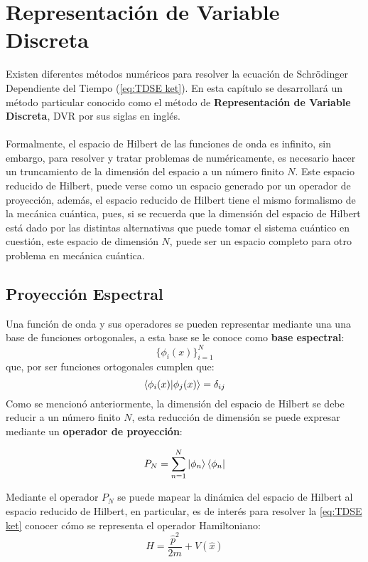 \chapter{Representación de Variable Discreta}\label{ch:DVR}
Existen diferentes métodos numéricos para resolver la ecuación de Schrödinger Dependiente del Tiempo (\autoref{eq:TDSE ket}). En esta capítulo se desarrollará un método particular conocido como el método de \textbf{Representación de Variable Discreta}, \acs{DVR} por sus siglas en inglés.
\\\\
Formalmente, el espacio de Hilbert de las funciones de onda es infinito, sin embargo, para resolver y tratar problemas de numéricamente, es necesario hacer un truncamiento de la dimensión del espacio a un número finito $N$. Este espacio reducido de Hilbert, puede verse como un espacio generado por un operador de proyección, además, el espacio reducido de Hilbert tiene el mismo formalismo de la mecánica cuántica, pues, si se recuerda que la dimensión del espacio de Hilbert está dado por las distintas alternativas que puede tomar el sistema cuántico en cuestión, este espacio de dimensión $N$, puede ser un espacio completo para otro problema en mecánica cuántica.

\section{Proyección Espectral}
Una función de onda y sus operadores se pueden representar mediante una una base de funciones ortogonales, a esta base se le conoce como \textbf{base espectral}:
$$\{\phi_i(x)\}_{i=1}^{N}$$
que, por ser funciones ortogonales cumplen que:
$$\bra{\phi_i(x)}\ket{\phi_j(x)} = \delta_{ij}$$
Como se mencionó anteriormente, la dimensión del espacio de Hilbert se debe reducir a un número finito $N$, esta reducción de dimensión se puede expresar mediante un \textbf{operador de proyección}:

\begin{equation}
  \label{eq:operadorproyeccion}
  P_N = \sum_{n=1}^N\ket{\phi_n}\bra{\phi_n}
\end{equation}

Mediante el operador $P_N$ se puede mapear la dinámica del espacio de Hilbert al espacio reducido de Hilbert, en particular, es de interés para resolver la \autoref{eq:TDSE ket} conocer cómo se representa el operador Hamiltoniano:
\begin{equation}
  \label{eq:Hamiltoniano}
  H = \frac{\hat{p}^2}{2m}+V(\hat{x})
\end{equation}


